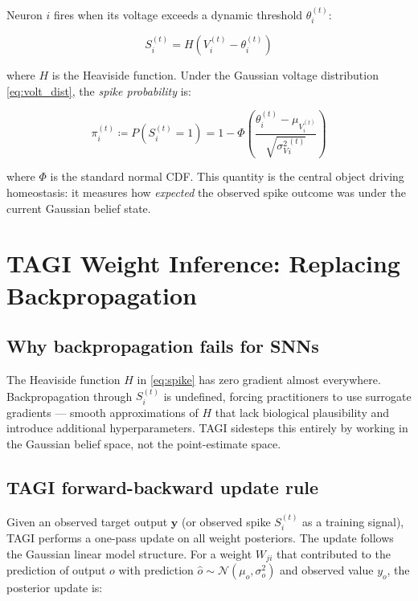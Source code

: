 \documentclass[12pt, a4paper]{article}
\newcommand{\Normal}{\mathcal{N}}
\newcommand{\mV}{\mu_{V}}
\newcommand{\sV}{\sigma^{2}_{V}}
\begin{document}
Neuron $i$ fires when its voltage exceeds a dynamic threshold $\theta_i^{(t)}$:

\begin{equation}
    S_i^{(t)} = H\!\left(V_i^{(t)} - \theta_i^{(t)}\right)
    \label{eq:spike}
\end{equation}

where $H$ is the Heaviside function. Under the Gaussian voltage distribution
\eqref{eq:volt_dist}, the \emph{spike probability} is:

\begin{equation}
    \boxed{
    \pi_i^{(t)} \coloneqq P\!\left(S_i^{(t)} = 1\right)
    = 1 - \Phi\!\left(\frac{\theta_i^{(t)} - \mV_i^{(t)}}{\sqrt{\sV_i^{(t)}}}\right)
    }
    \label{eq:spike_prob}
\end{equation}

where $\Phi$ is the standard normal CDF. This quantity is the central object driving
homeostasis: it measures how \emph{expected} the observed spike outcome was under the
current Gaussian belief state.

\section{TAGI Weight Inference: Replacing Backpropagation}
\label{sec:tagi}

\subsection{Why backpropagation fails for SNNs}

The Heaviside function $H$ in \eqref{eq:spike} has zero gradient almost everywhere.
Backpropagation through $S_i^{(t)}$ is undefined, forcing practitioners to use surrogate
gradients --- smooth approximations of $H$ that lack biological plausibility and
introduce additional hyperparameters. TAGI sidesteps this entirely by working in the
Gaussian belief space, not the point-estimate space.

\subsection{TAGI forward-backward update rule}

Given an observed target output $\bm{y}$ (or observed spike $S_i^{(t)}$ as a training
signal), TAGI performs a one-pass update on all weight posteriors. The update follows
the Gaussian linear model structure. For a weight $W_{ji}$ that contributed to the
prediction of output $o$ with prediction $\hat{o} \sim \Normal(\mu_o, \sigma^2_o)$ and
observed value $y_o$, the posterior update is:
\end{document}
